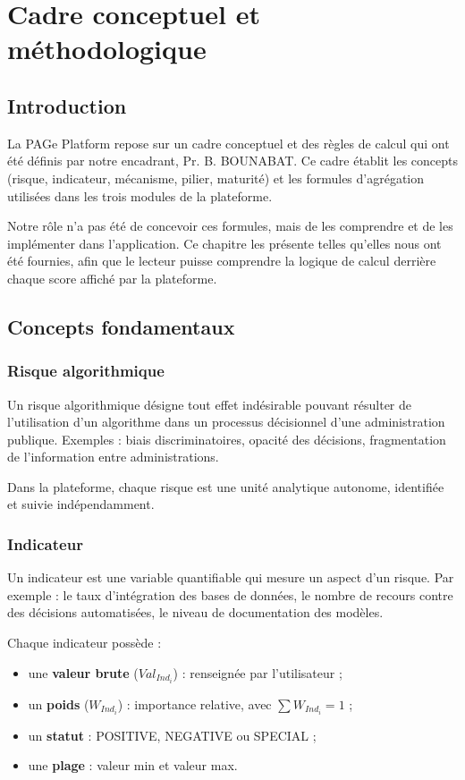 \chapter{Cadre conceptuel et méthodologique}

\section{Introduction}
La PAGe Platform repose sur un cadre conceptuel et des règles de calcul qui ont été définis par notre encadrant, Pr. B. BOUNABAT. Ce cadre établit les concepts (risque, indicateur, mécanisme, pilier, maturité) et les formules d'agrégation utilisées dans les trois modules de la plateforme.

Notre rôle n'a pas été de concevoir ces formules, mais de les comprendre et de les implémenter dans l'application. Ce chapitre les présente telles qu'elles nous ont été fournies, afin que le lecteur puisse comprendre la logique de calcul derrière chaque score affiché par la plateforme.

\section{Concepts fondamentaux}

\subsection{Risque algorithmique}
Un risque algorithmique désigne tout effet indésirable pouvant résulter de l'utilisation d'un algorithme dans un processus décisionnel d'une administration publique. Exemples : biais discriminatoires, opacité des décisions, fragmentation de l'information entre administrations.

Dans la plateforme, chaque risque est une unité analytique autonome, identifiée et suivie indépendamment.

\subsection{Indicateur}
Un indicateur est une variable quantifiable qui mesure un aspect d'un risque. Par exemple : le taux d'intégration des bases de données, le nombre de recours contre des décisions automatisées, le niveau de documentation des modèles.

Chaque indicateur possède :
\begin{itemize}
    \item une \textbf{valeur brute} ($Val_{Ind_i}$) : renseignée par l'utilisateur ;
    \item un \textbf{poids} ($W_{Ind_i}$) : importance relative, avec $\sum W_{Ind_i} = 1$ ;
    \item un \textbf{statut} : POSITIVE, NEGATIVE ou SPECIAL ;
    \item une \textbf{plage} : valeur min et valeur max.
\end{itemize}

